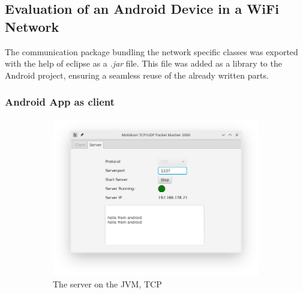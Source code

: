 \subsection{Evaluation of an Android Device in a WiFi Network}
The communication package bundling the network specific classes was exported with the help of eclipse as a \textit{.jar} file. This file was added as a library to the Android project, ensuring a seamless reuse of the already written parts. 

\subsubsection{Android App as client}
\begin{figure}[H]
	\centering
	\begin{subfigure}{.49\textwidth}
		\centering
		\includegraphics[width=1\linewidth]{images/task3/subtask2/serverTCPNEW.png}
		\caption{The server on the JVM, TCP}
	\end{subfigure}
	\begin{subfigure}{.49\textwidth}
		\centering

\end{subfigure}
\end{figure}
